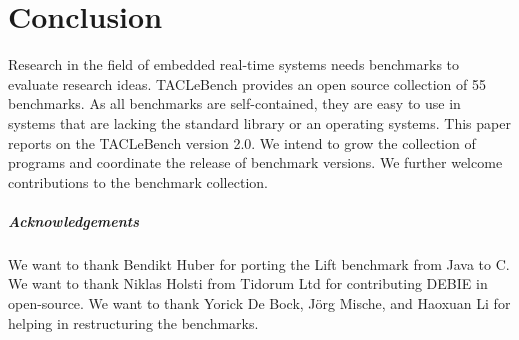 \documentclass[a4paper,UKenglish]{oasics}
\newcommand{\benchcount}{55 }
\begin{document}
\section{Conclusion}
\label{sec:conclusion}

Research in the field of embedded real-time systems needs benchmarks to
evaluate research ideas. TACLeBench provides an open source collection of
\benchcount benchmarks. As all benchmarks are self-contained, they are easy to
use in systems that are lacking the standard library or an operating systems.
%
This paper reports on the TACLeBench version 2.0.
We intend to grow the collection of programs and coordinate the
release of benchmark versions.
We further welcome contributions to the benchmark collection.



\subparagraph*{Acknowledgements}

We want to thank Bendikt Huber for porting the Lift benchmark from Java to C.
We want to thank Niklas Holsti from Tidorum Ltd for contributing DEBIE in open-source.
We want to thank Yorick De Bock, J{\"o}rg Mische, and Haoxuan Li for helping in restructuring the benchmarks.



\end{document}
